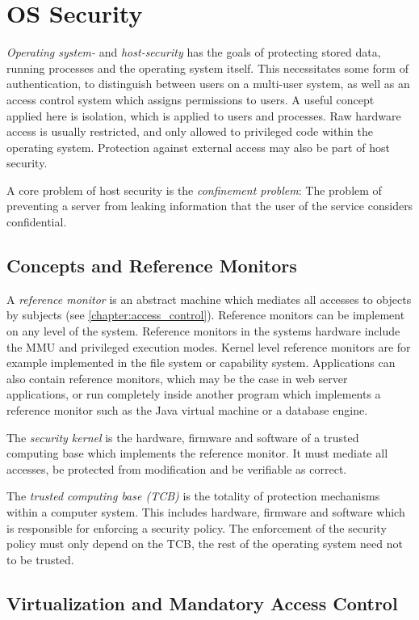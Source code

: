 \chapter{OS Security}
\textit{Operating system-} and \emph{host-security} has the goals of protecting
stored data, running processes and the operating system itself. This
necessitates some form of authentication, to distinguish between users on a
multi-user system, as well as an access control system which assigns permissions
to users. A useful concept applied here is isolation, which is applied to users
and processes. Raw hardware access is usually restricted, and only allowed to
privileged code within the operating system. Protection against external access
may also be part of host security.

A core problem of host security is the \emph{confinement problem}: The problem
of preventing a server from leaking information that the user of the service
considers confidential.

\section{Concepts and Reference Monitors}
A \emph{reference monitor} is an abstract machine which mediates all accesses to
objects by subjects (see \cref{chapter:access_control}). Reference monitors can
be implement on any level of the system. Reference monitors in the systems
hardware include the MMU and privileged execution modes. Kernel level reference
monitors are for example implemented in the file system or capability system.
Applications can also contain reference monitors, which may be the case in web
server applications, or run completely inside another program which implements a
reference monitor such as the Java virtual machine or a database engine.

The \emph{security kernel} is the hardware, firmware and software of a trusted
computing base which implements the reference monitor. It must mediate all
accesses, be protected from modification and be verifiable as correct.

The \emph{trusted computing base (TCB)} is the totality of protection mechanisms
within a computer system. This includes hardware, firmware and software which is
responsible for enforcing a security policy. The enforcement of the security
policy must only depend on the TCB, the rest of the operating system need not to
be trusted.

\section{Virtualization and Mandatory Access Control}
